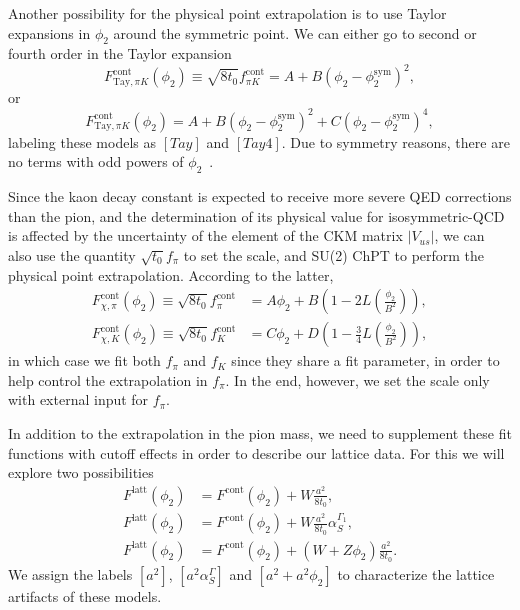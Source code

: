 Another possibility for the physical point extrapolation is to use Taylor expansions in $\phi_2$ around the symmetric point. We can either go to second or fourth order in the Taylor expansion
\begin{equation}
\label{ch_ss:eq:Tay}
F_{\textrm{Tay},\pi K}^{\textrm{cont}}(\phi_2)\equiv\sqrt{8t_0}f_{\pi K}^{\textrm{cont}}=A+B\left(\phi_2-\phi_2^{\textrm{sym}}\right)^2,
\end{equation}
or
\begin{equation}
\label{ch_ss:eq:Tay4}
F_{\textrm{Tay},\pi K}^{\textrm{cont}}(\phi_2)=A+B\left(\phi_2-\phi_2^{\textrm{sym}}\right)^2+C\left(\phi_2-\phi_2^{\textrm{sym}}\right)^4,
\end{equation}
labeling these models as $[Tay]$ and $[Tay4]$. Due to symmetry reasons, there are no terms with odd powers of $\phi_2$~\citep{Bietenholz:2011qq}.

Since the kaon decay constant is expected to receive more severe QED corrections than the pion, and the determination of its physical value for isosymmetric-QCD is affected by the uncertainty of the element of the CKM matrix $|V_{us}|$, we can also use the quantity $\sqrt{t_0}f_{\pi}$ to set the scale, and SU(2) ChPT to perform the physical point extrapolation. According to the latter,
\begin{align}
F_{\chi,\pi}^{\textrm{cont}}(\phi_2)\equiv\sqrt{8t_0}f_{\pi}^{\textrm{cont}}&=A\phi_2+B\left(1-2L\left(\frac{\phi_2}{B^2}\right)\right),\\
F_{\chi,K}^{\textrm{cont}}(\phi_2)\equiv\sqrt{8t_0}f_K^{\textrm{cont}}&=C\phi_2+D\left(1-\frac{3}{4}L\left(\frac{\phi_2}{B^2}\right)\right),
\end{align}
in which case we fit both $f_{\pi}$ and $f_K$ since they share a fit parameter, in order to help control the extrapolation in $f_{\pi}$. In the end, however, we set the scale only with external input for $f_{\pi}$.

In addition to the extrapolation in the pion mass, we need to supplement these fit functions with cutoff effects in order to describe our lattice data. For this we will explore two possibilities
\begin{align}
\label{ch_ss:eq:a2}
F^{\textrm{latt}}(\phi_2)&=F^{\textrm{cont}}(\phi_2)+W\frac{a^2}{8t_0},\\
F^{\textrm{latt}}(\phi_2)&=F^{\textrm{cont}}(\phi_2)+W\frac{a^2}{8t_0}\alpha_S^{\Gamma_1},\\
F^{\textrm{latt}}(\phi_2)&=F^{\textrm{cont}}(\phi_2)+\left(W+Z\phi_2\right)\frac{a^2}{8t_0}.
\end{align}
We assign the labels $[a^2]$, $[a^2\alpha_S^{\Gamma}]$ and $[a^2+a^2\phi_2]$ to characterize the lattice artifacts of these models.

